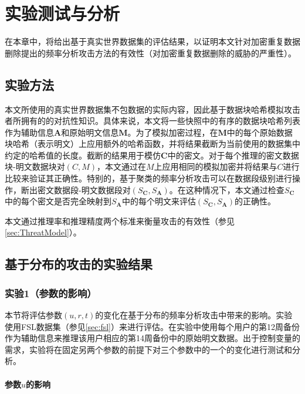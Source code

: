 \chapter{实验测试与分析}
\label{sec:Experiment}

在本章中，将给出基于真实世界数据集的评估结果，以证明本文针对加密重复数据删除提出的频率分析攻击方法的有效性（对加密重复数据删除的威胁的严重性）。

\section{实验方法}
\label{sec:dataset}

本文所使用的真实世界数据集不包数据的实际内容，因此基于数据块哈希模拟攻击者所拥有的的对抗性知识。具体来说，本文将一些快照中的有序的数据块哈希列表作为辅助信息$\mathbf{A}$和原始明文信息$\mathbf{M}$。为了模拟加密过程，在$\mathbf{M}$中的每个原始数据块哈希（表示明文）上应用额外的哈希函数，并将结果截断为当前使用的数据集中约定的哈希值的长度。截断的结果用于模仿$\mathbf{C}$中的密文。对于每个推理的密文数据块-明文数据块对$(C,M)$，本文通过在$M$上应用相同的模拟加密并将结果与​​$C$进行比较来验证其正确性。特别的，基于聚类的频率分析攻击可以在数据段级别进行操作，断出密文数据段-明文数据段对$(S_\mathbf{C},S_\mathbf {A})$。在这种情况下，本文通过检查$S_\mathbf{C}$中的每个密文是否完全映射到$S_\mathbf{A}$中的每个明文来评估$(S_\mathbf {C},S_\mathbf{A})$的正确性。

本文通过推理率和推理精度两个标准来衡量攻击的有效性（参见\ref{sec:ThreatModel}）。


\section{基于分布的攻击的实验结果}
\label{sec:experiment-distribution}

\subsection{实验1（参数的影响）}
\label{sec:exp1}

本节将评估参数$(u, r, t)$的变化在基于分布的频率分析攻击中带来的影响。实验使用FSL数据集（参见\ref{sec:fsl}）来进行评估。在实验中使用每个用户的第12周备份作为辅助信息来推理该用户相应的第14周备份中的原始明文数据。出于控制变量的需求，实验将在固定另两个参数的前提下对三个参数中的一个的变化进行测试和分析。


\subsubsection{参数$u$的影响}

